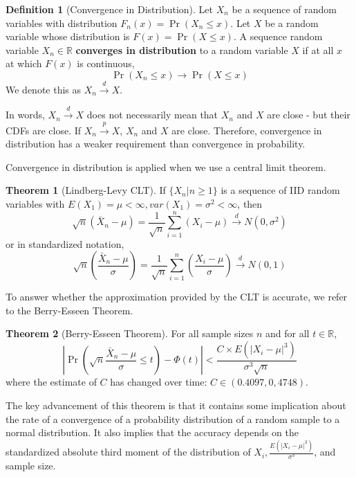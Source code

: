 \documentclass[12pt]{article}
\theoremstyle{definition}
\newtheorem{definition}{Definition}[section]
\theoremstyle{property}
\theoremstyle{example}
\newtheorem{theorem}{Theorem}[section]
\begin{document}
\begin{mdframed}[backgroundcolor=blue!5] 
\begin{definition}[Convergence in Distribution]
Let $X_n$ be a sequence of random variables with distribution $F_n(x)=\Pr(X_n\leq x)$. Let $X$ be a random variable whose distribution is $F(x)=\Pr(X\leq x)$. A sequence random variable $X_n\in \mathbb{R}$ \textbf{converges in distribution} to a random variable $X$ if at all $x$ at which $F(x)$ is continuous, 
\[
\Pr(X_n\leq x)\to \Pr(X\leq x)
\]
We denote this as $X_n\xrightarrow{d}X$. 
\end{definition}
\end{mdframed}\par
In words, $X_n\xrightarrow{d}X$ does not necessarily mean that $X_n$ and $X$ are close - but their CDFs are close. If $X_n\xrightarrow{p}X$, $X_n$ and $X$ are close. Therefore, convergence in distribution has a weaker requirement than convergence in probability.\par
Convergence in distribution is applied when we use a central limit theorem. 
\begin{mdframed}[backgroundcolor=green!5] 
\begin{theorem}[Lindberg-Levy CLT]
If $\{X_n|n\geq1\}$ is a sequence of IID random variables with $E(X_1)=\mu<\infty, var(X_1)=\sigma^2<\infty$, then
\footnotesize{\[
\sqrt{n}(\bar{X}_n-\mu)=\frac{1}{\sqrt{n}}\sum_{i=1}^n(X_i-\mu)\xrightarrow{d}N(0,\sigma^2) 
\]}\normalsize or in standardized notation,
\footnotesize{\[
\sqrt{n}\left(\frac{\bar{X}_n-\mu}{\sigma}\right)=\frac{1}{\sqrt{n}}\sum_{i=1}^n\left(\frac{X_i-\mu}{\sigma}\right)\xrightarrow{d}N(0,1) 
\]}\normalsize
\end{theorem}
\end{mdframed}
\par
To answer whether the approximation provided by the CLT is accurate, we refer to the Berry-Esseen Theorem.
\begin{mdframed}[backgroundcolor=green!5] 
\begin{theorem}[Berry-Esseen Theorem]
For all sample sizes $n$ and for all $t\in\mathbb{R}$, 
\footnotesize{\[
\left|\Pr\left(\sqrt{n}\frac{\bar{X}_n-\mu}{\sigma}\leq t\right)-\Phi(t)\right|<\frac{C\times E(|X_i-\mu|^3)}{\sigma^3\sqrt{n}}
\]}\normalsize
where the estimate of $C$ has changed over time: $C\in(0.4097, 0,4748)$. 
\end{theorem}
\end{mdframed}\par
The key advancement of this theorem is that it contains some implication about the rate of a convergence of a probability distribution of a random sample to a normal distribution. It also implies that the accuracy depends on the standardized absolute third moment of the distribution of $X_i, \frac{E(|X_i-\mu|^3)}{\sigma^3}$, and sample size. \par
\end{document}
